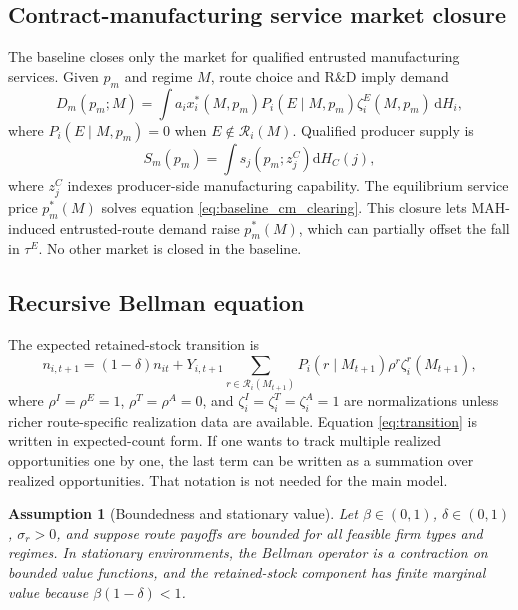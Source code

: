\documentclass[12pt]{article}
\newtheorem{assumption}{Assumption}
\newcommand{\1}{\mathbf{1}}
\newcommand{\dd}{\mathrm{d}}
\newcommand{\calR}{\mathcal{R}}
\begin{document}
\subsection{Contract-manufacturing service market closure}
\label{sec:cm_market_baseline}

The baseline closes only the market for qualified entrusted manufacturing services. Given $p_m$ and regime $M$, route choice and R\&D imply demand
\begin{equation}
    D_m(p_m;M)
    =
    \int
    a_i x_i^*(M,p_m)
    P_i(E\mid M,p_m)
    \zeta_i^E(M,p_m)
    \,\dd H_i,
    \label{eq:cm_demand_baseline}
\end{equation}
where $P_i(E\mid M,p_m)=0$ when $E\notin\calR_i(M)$. Qualified producer supply is
\begin{equation}
    S_m(p_m)=\int s_j(p_m;z_j^C)\dd H_C(j),
    \label{eq:cm_supply_baseline}
\end{equation}
where $z_j^C$ indexes producer-side manufacturing capability. The equilibrium service price $p_m^*(M)$ solves equation \eqref{eq:baseline_cm_clearing}. This closure lets MAH-induced entrusted-route demand raise $p_m^*(M)$, which can partially offset the fall in $\tau^E$. No other market is closed in the baseline.

\subsection{Recursive Bellman equation}

The expected retained-stock transition is
\begin{equation}
    n_{i,t+1}
    =
    (1-\delta)n_{it}
    +
    Y_{i,t+1}
    \sum_{r\in\calR_i(M_{t+1})}P_i(r\mid M_{t+1})\rho^r\zeta_i^r(M_{t+1}),
    \label{eq:transition}
\end{equation}
where $\rho^I=\rho^E=1$, $\rho^T=\rho^A=0$, and $\zeta_i^I=\zeta_i^T=\zeta_i^A=1$ are normalizations unless richer route-specific realization data are available. Equation \eqref{eq:transition} is written in expected-count form. If one wants to track multiple realized opportunities one by one, the last term can be written as a summation over realized opportunities. That notation is not needed for the main model.

\begin{assumption}[Boundedness and stationary value]
\label{ass:bounded_stationary}
Let $\beta\in(0,1)$, $\delta\in(0,1)$, $\sigma_r>0$, and suppose route payoffs are bounded for all feasible firm types and regimes. In stationary environments, the Bellman operator is a contraction on bounded value functions, and the retained-stock component has finite marginal value because $\beta(1-\delta)<1$.
\end{assumption}
\end{document}
